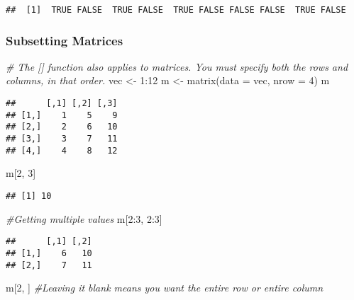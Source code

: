 \documentclass[
]{article}
\newenvironment{Shaded}{\begin{snugshade}}{\end{snugshade}}
\newcommand{\AttributeTok}[1]{\textcolor[rgb]{0.77,0.63,0.00}{#1}}
\newcommand{\CommentTok}[1]{\textcolor[rgb]{0.56,0.35,0.01}{\textit{#1}}}
\newcommand{\DecValTok}[1]{\textcolor[rgb]{0.00,0.00,0.81}{#1}}
\newcommand{\FunctionTok}[1]{\textcolor[rgb]{0.00,0.00,0.00}{#1}}
\newcommand{\NormalTok}[1]{#1}
\newcommand{\OtherTok}[1]{\textcolor[rgb]{0.56,0.35,0.01}{#1}}
\newcommand{\SpecialCharTok}[1]{\textcolor[rgb]{0.00,0.00,0.00}{#1}}
\begin{document}
\begin{verbatim}
##  [1]  TRUE FALSE  TRUE FALSE  TRUE FALSE FALSE FALSE  TRUE FALSE
\end{verbatim}

\hypertarget{subsetting-matrices}{%
\subsubsection{Subsetting Matrices}\label{subsetting-matrices}}

\begin{Shaded}
\begin{Highlighting}[]
\CommentTok{\# The [] function also applies to matrices. You must specify both the rows and columns, in that order. }
\NormalTok{vec }\OtherTok{\textless{}{-}} \DecValTok{1}\SpecialCharTok{:}\DecValTok{12}
\NormalTok{m }\OtherTok{\textless{}{-}} \FunctionTok{matrix}\NormalTok{(}\AttributeTok{data =}\NormalTok{ vec, }\AttributeTok{nrow =} \DecValTok{4}\NormalTok{)}
\NormalTok{m}
\end{Highlighting}
\end{Shaded}

\begin{verbatim}
##      [,1] [,2] [,3]
## [1,]    1    5    9
## [2,]    2    6   10
## [3,]    3    7   11
## [4,]    4    8   12
\end{verbatim}

\begin{Shaded}
\begin{Highlighting}[]
\NormalTok{m[}\DecValTok{2}\NormalTok{, }\DecValTok{3}\NormalTok{]}
\end{Highlighting}
\end{Shaded}

\begin{verbatim}
## [1] 10
\end{verbatim}

\begin{Shaded}
\begin{Highlighting}[]
\CommentTok{\#Getting multiple values}
\NormalTok{m[}\DecValTok{2}\SpecialCharTok{:}\DecValTok{3}\NormalTok{, }\DecValTok{2}\SpecialCharTok{:}\DecValTok{3}\NormalTok{]}
\end{Highlighting}
\end{Shaded}

\begin{verbatim}
##      [,1] [,2]
## [1,]    6   10
## [2,]    7   11
\end{verbatim}

\begin{Shaded}
\begin{Highlighting}[]
\NormalTok{m[}\DecValTok{2}\NormalTok{, ] }\CommentTok{\#Leaving it blank means you want the entire row or entire column}
\end{Highlighting}
\end{Shaded}
\end{document}
